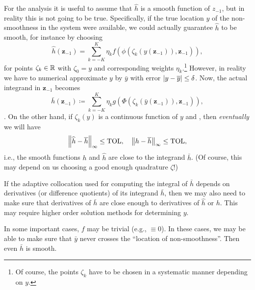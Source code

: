\documentclass[11pt]{article}
\begin{document}
For the analysis it is useful to assume that $\hat{h}$ is a smooth function of $z_{-1}$, but in reality this is not going to be true. Specifically, if the true location $y$ of the non-smoothness in the system were available, we could actually guarantee $\hat{h}$ to be smooth, for instance by choosing 
\begin{equation*}
	\hat{h}(\mathbf{z}_{-1}) = \sum_{k=-K}^{K} \eta_k f\left( \phi\left( \zeta_k(y(\mathbf{z}_{-1})),
	\mathbf{z}_{-1} \right) \right),
\end{equation*}
for points $\zeta_k \in \mathbb{R}$ with $\zeta_0 = y$ and corresponding weights
$\eta_k$.\footnote{Of course, the points $\zeta_k$ have to be chosen in a
	systematic manner depending on $y$.} However, in reality we have to
numerical approximate $y$ by $\bar{y}$ with error
$\left\lvert y - \overline{y}\right\rvert \le \delta$. Now, the actual integrand in $\mathbf{z}_{-1}$ becomes 
\begin{equation*}
	\bar{h}(\mathbf{z}_{-1}) \coloneqq \sum_{k=-K}^{K} \eta_k g\left( \Phi\left( \zeta_k(
	\bar{y}(\mathbf{z}_{-1})), \mathbf{z}_{-1} \right) \right),
\end{equation*}
. On the other hand, if
$\zeta_k(y)$ is a continuous function of $y$ and , then \emph{eventually} we will have
\begin{equation*}
	\left\lVert\widehat{h} - \overline{h}\right\rVert_\infty \le \mathrm{TOL}, \quad \left\lVert h - \overline{h}\right\rVert_\infty
	\le \mathrm{TOL}, 
\end{equation*}
i.e., the smooth functions $h$ and $\hat{h}$ are close to the integrand $\bar{h}$. (Of course, this may depend on us choosing a good enough quadrature
$\zeta$!) 
\begin{remark}
	If the adaptive collocation used for computing the integral of $\bar{h}$
	depends on derivatives (or difference quotients) of its integrand $\bar{h}$,
	then we may also need to make sure that derivatives of $\bar{h}$ are close
	enough to derivatives of $\hat{h}$ or $h$. This may require higher order
	solution methods for determining $y$.
\end{remark}
\begin{remark}
	In some important cases, $f$ may be trivial (e.g., $\equiv 0$). In these
	cases, we may be able to make sure that $\bar{y}$ never crosses the ``location of
	non-smoothness''. Then even $\bar{h}$ is smooth.
\end{remark}
\end{document}
